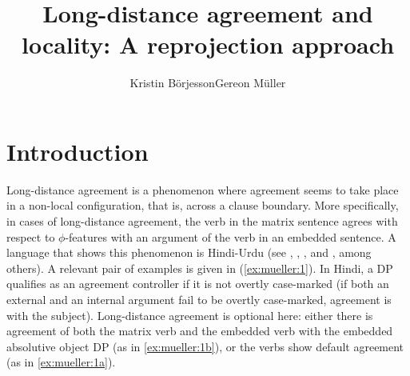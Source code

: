 \documentclass[output=paper
,modfonts
,nonflat]{langsci/langscibook}
\title{Long-distance agreement and locality:\newlineCover{} A reprojection approach}
\author{Kristin Börjesson\affiliation{Universität Leipzig}\lastand Gereon Müller\affiliation{Universität Leipzig}}
\begin{document}
	
	\maketitle
	
	\newcommand{\refprefix}{ex:mueller:}
	\section{Introduction} \label{sec-bjoe-muel:1}
	
	Long-distance agreement is a phenomenon where agreement seems to take
	place in a non-local configuration, that is, across a clause boundary.
	More specifically, in cases of long-distance agreement, the verb in
	the matrix sentence agrees with respect to $\phi$-features with an
	argument of the verb in an embedded sentence. A language that shows
	this phenomenon is Hindi-Urdu (see \citealt{Mahajan:90},
	\citealt{Butt:95,Butt:08}, \citealt{Bhatt:05}, and \citealt{Chandra:05}, among
	others). A relevant pair of examples is given in (\ref{ex:mueller:1}). In Hindi, a DP
	qualifies as an agreement controller if it is not overtly case-marked (if
	both an external and an internal argument fail to be overtly
	case-marked, agreement is with the subject). Long-distance agreement
	is optional here: either there is agreement of both the matrix verb
	and the embedded verb with the embedded absolutive object DP (as in
	\ref{ex:mueller:1b}), or the verbs show default agreement (as in \ref{ex:mueller:1a}).
	
\end{document}

